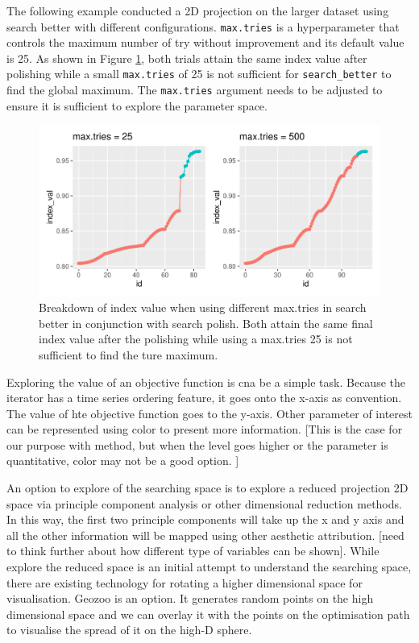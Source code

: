 \documentclass[12pt]{article}
\begin{document}
The following example conducted a 2D projection on the larger dataset
using search better with different configurations. \texttt{max.tries} is
a hyperparameter that controls the maximum number of try without
improvement and its default value is 25. As shown in Figure
\ref{trace-compare}, both trials attain the same index value after
polishing while a small \texttt{max.tries} of 25 is not sufficient for
\texttt{search\_better} to find the global maximum. The
\texttt{max.tries} argument needs to be adjusted to ensure it is
sufficient to explore the parameter space.

\begin{figure}
\centering
\includegraphics{paper_files/figure-latex/polish-1.pdf}
\caption{\label{trace-compare}Breakdown of index value when using
different max.tries in search better in conjunction with search polish.
Both attain the same final index value after the polishing while using a
max.tries 25 is not sufficient to find the ture maximum.}
\end{figure}

Exploring the value of an objective function is cna be a simple task.
Because the iterator has a time series ordering feature, it goes onto
the x-axis as convention. The value of hte objective function goes to
the y-axis. Other parameter of interest can be represented using color
to present more information. {[}This is the case for our purpose with
method, but when the level goes higher or the parameter is quantitative,
color may not be a good option. {]}

An option to explore of the searching space is to explore a reduced
projection 2D space via principle component analysis or other
dimensional reduction methods. In this way, the first two principle
components will take up the x and y axis and all the other information
will be mapped using other aesthetic attribution. {[}need to think
further about how different type of variables can be shown{]}. While
explore the reduced space is an initial attempt to understand the
searching space, there are existing technology for rotating a higher
dimensional space for visualisation. Geozoo is an option. It generates
random points on the high dimensional space and we can overlay it with
the points on the optimisation path to visualise the spread of it on the
high-D sphere.
\end{document}
